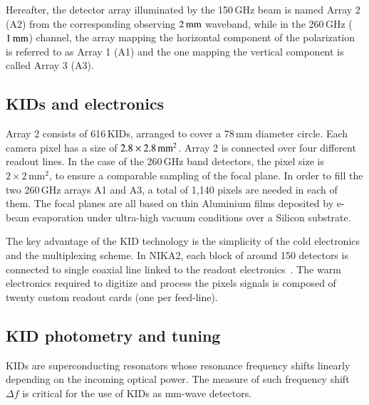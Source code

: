 Hereafter, the detector array illuminated by the 150\,GHz beam is named Array
2 (A2) from the corresponding observing $2\, \rm{mm}$ waveband,
while in the 260\,GHz ($1\, \rm{mm}$) channel, the array mapping the
horizontal component of the polarization is referred to as Array 1 (A1)
and the one mapping the vertical component is called Array 3 (A3). 

\subsection{KIDs and electronics}
\label{se:array}

Array 2 consists of 616\,KIDs, arranged to cover a 78\,mm diameter
circle. Each camera pixel has a size of
$2.8\times2.8\textrm{\,mm}^2$. Array 2 is connected over four different
readout lines. In the case of the 260\,GHz band detectors, the pixel size is
$2\times 2\mathrm{\,mm}^2$, to ensure a comparable sampling of the focal
plane. In order to fill the two 260\,GHz arrays A1 and A3, a total of
1,140 pixels are needed in each of them. The focal planes are all
based on thin Aluminium films deposited by e-beam evaporation under
ultra-high vacuum conditions over a Silicon substrate.

The key advantage of the KID technology is the simplicity of the cold
electronics and the multiplexing scheme. In NIKA2, each block of around 150
detectors is connected to single coaxial line linked to the readout
electronics~\citep{Bourrion2016}.
The warm electronics required to digitize
and process the pixels signals is composed of twenty custom readout
cards (one per feed-line).

\subsection{KID photometry and tuning}
\label{se:tuning}

KIDs are superconducting resonators whose resonance
frequency shifts linearly depending on the incoming optical power. The
measure of such frequency shift $\Delta f$ is critical for the use of
KIDs as mm-wave detectors. 

